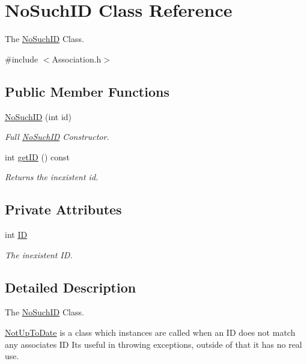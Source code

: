 \hypertarget{classNoSuchID}{}\section{No\+Such\+ID Class Reference}
\label{classNoSuchID}


The \mbox{\hyperlink{classNoSuchID}{No\+Such\+ID}} Class.  




{\ttfamily \#include $<$Association.\+h$>$}

\subsection*{Public Member Functions}
\begin{DoxyCompactItemize}
\item 
\mbox{\hyperlink{classNoSuchID_a3b85ef775a99d9f93eabaa21ef29e950}{No\+Such\+ID}} (int id)
\begin{DoxyCompactList}\small\item\em Full \mbox{\hyperlink{classNoSuchID}{No\+Such\+ID}} Constructor. \end{DoxyCompactList}\item 
int \mbox{\hyperlink{classNoSuchID_a42be677d2a3bbf7c12feffeda0904bfa}{get\+ID}} () const
\begin{DoxyCompactList}\small\item\em Returns the inexistent id. \end{DoxyCompactList}\end{DoxyCompactItemize}
\subsection*{Private Attributes}
\begin{DoxyCompactItemize}
\item 
int \mbox{\hyperlink{classNoSuchID_a1b0c95e546b2147a298230f33d3dbeec}{ID}}
\begin{DoxyCompactList}\small\item\em The inexistent ID. \end{DoxyCompactList}\end{DoxyCompactItemize}


\subsection{Detailed Description}
The \mbox{\hyperlink{classNoSuchID}{No\+Such\+ID}} Class. 

\mbox{\hyperlink{classNotUpToDate}{Not\+Up\+To\+Date}} is a class which instances are called when an ID does not match any associate\textquotesingle{}s ID Its useful in throwing exceptions, outside of that it has no real use. 


